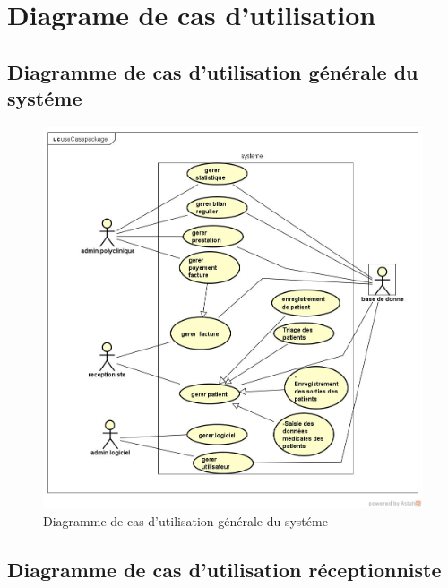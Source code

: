	\newpage
	
	
	
	
	
	
	
	
	
	
	
	\section{Diagrame de cas d'utilisation}
	
	\subsection{Diagramme de cas d'utilisation générale du systéme}
	\begin{figure}[h]
\includegraphics[scale=0.5]{Chapitre2/images/mainUseCaseDiagramme.jpg}
\caption{Diagramme de cas d'utilisation générale du systéme}
	\end{figure}
	
\newpage

	\subsection{Diagramme de cas d'utilisation réceptionniste }
	  
